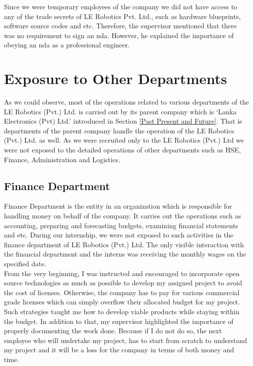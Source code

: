 \documentclass[a4paper,12pt]{report}
\begin{document}
Since we were temporary employees of the company we did not have access to any of the trade secrets of LE Robotics Pvt. Ltd., such as hardware blueprints, software source codes and etc. Therefore, the supervisor mentioned that  there  was no requirement to sign an \ac{nda}. However, he explained the importance of obeying an \ac{nda} as a professional engineer.


\chapter{Exposure to Other Departments}

As we could observe, most of the operations related to various departments of the LE Robotics (Pvt.) Ltd. is carried out by its parent company which is `Lanka Electronics (Pvt) Ltd.' introduced in Section \ref{Past Present and Future}. That is departments of the parent company handle the operation of the LE Robotics (Pvt.) Ltd. as well. As we were recruited only to the LE Robotics (Pvt.) Ltd we were not exposed to the detailed operations of other departments such as HSE, Finance, Administration and Logistics. 

\section{Finance Department}

Finance Department is the entity in an organization which is responsible for handling money on behalf of the company. It carries out the operations such as accounting, preparing and forecasting budgets, examining financial statements and etc. During our internship, we were not exposed to such activities in the finance department of LE Robotics (Pvt.) Ltd. The only visible interaction with the financial department and the interns was receiving the monthly wages on the specified date.\\

From the very beginning,  I was instructed and encouraged to incorporate open source technologies as much as possible to develop my assigned project to avoid the cost of licenses. Otherwise, the company has to pay for various commercial grade licenses which can simply overflow their allocated budget for my project.  Such strategies taught me how to develop viable products while staying within the budget. In addition to that, my supervisor highlighted the importance of properly documenting the work done. Because if I do not do so, the next employee who will undertake my project, has to start from scratch to understand my project and it will be a loss for the company in terms of both money and time.
\end{document}
